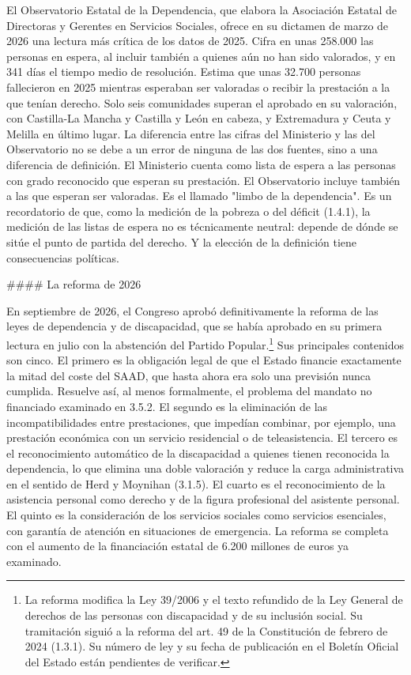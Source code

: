 \documentclass[10pt,a4paper]{article}
\begin{document}
El Observatorio Estatal de la Dependencia, que elabora la Asociación Estatal de Directoras y Gerentes en Servicios Sociales, ofrece en su dictamen de marzo de 2026 una lectura más crítica de los datos de 2025. Cifra en unas 258.000 las personas en espera, al incluir también a quienes aún no han sido valorados, y en 341 días el tiempo medio de resolución. Estima que unas 32.700 personas fallecieron en 2025 mientras esperaban ser valoradas o recibir la prestación a la que tenían derecho. Solo seis comunidades superan el aprobado en su valoración, con Castilla-La Mancha y Castilla y León en cabeza, y Extremadura y Ceuta y Melilla en último lugar. La diferencia entre las cifras del Ministerio y las del Observatorio no se debe a un error de ninguna de las dos fuentes, sino a una diferencia de definición. El Ministerio cuenta como lista de espera a las personas con grado reconocido que esperan su prestación. El Observatorio incluye también a las que esperan ser valoradas. Es el llamado "limbo de la dependencia". Es un recordatorio de que, como la medición de la pobreza o del déficit (1.4.1), la medición de las listas de espera no es técnicamente neutral: depende de dónde se sitúe el punto de partida del derecho. Y la elección de la definición tiene consecuencias políticas.

#### La reforma de 2026

En septiembre de 2026, el Congreso aprobó definitivamente la reforma de las leyes de dependencia y de discapacidad, que se había aprobado en su primera lectura en julio con la abstención del Partido Popular.\footnote{%
    La reforma modifica la Ley 39/2006 y el texto refundido de la Ley General de derechos de las personas con discapacidad y de su inclusión social. Su tramitación siguió a la reforma del art. 49 de la Constitución de febrero de 2024 (1.3.1). Su número de ley y su fecha de publicación en el Boletín Oficial del Estado están pendientes de verificar.
} Sus principales contenidos son cinco. El primero es la obligación legal de que el Estado financie exactamente la mitad del coste del SAAD, que hasta ahora era solo una previsión nunca cumplida. Resuelve así, al menos formalmente, el problema del mandato no financiado examinado en 3.5.2. El segundo es la eliminación de las incompatibilidades entre prestaciones, que impedían combinar, por ejemplo, una prestación económica con un servicio residencial o de teleasistencia. El tercero es el reconocimiento automático de la discapacidad a quienes tienen reconocida la dependencia, lo que elimina una doble valoración y reduce la carga administrativa en el sentido de Herd y Moynihan (3.1.5). El cuarto es el reconocimiento de la asistencia personal como derecho y de la figura profesional del asistente personal. El quinto es la consideración de los servicios sociales como servicios esenciales, con garantía de atención en situaciones de emergencia. La reforma se completa con el aumento de la financiación estatal de 6.200 millones de euros ya examinado.
\end{document}
